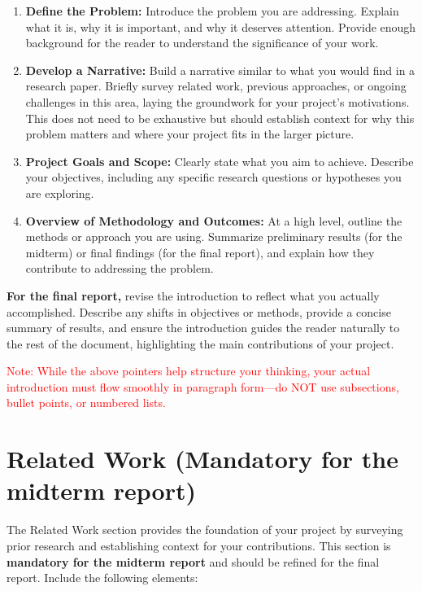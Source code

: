 \documentclass{article}
\begin{document}
\begin{enumerate}

\item\textbf{Define the Problem:} Introduce the problem you are addressing. Explain what it is, why it is important, and why it deserves attention. Provide enough background for the reader to understand the significance of your work.

\item\textbf{Develop a Narrative:} Build a narrative similar to what you would find in a research paper. Briefly survey related work, previous approaches, or ongoing challenges in this area, laying the groundwork for your project's motivations. This does not need to be exhaustive but should establish context for why this problem matters and where your project fits in the larger picture.

\item\textbf{Project Goals and Scope:} Clearly state what you aim to achieve. Describe your objectives, including any specific research questions or hypotheses you are exploring.

\item\textbf{Overview of Methodology and Outcomes:} At a high level, outline the methods or approach you are using. Summarize preliminary results (for the midterm) or final findings (for the final report), and explain how they contribute to addressing the problem.
\end{enumerate}

\textbf{For the final report,} revise the introduction to reflect what you actually accomplished. Describe any shifts in objectives or methods, provide a concise summary of results, and ensure the introduction guides the reader naturally to the rest of the document, highlighting the main contributions of your project.

\textcolor{red}{Note: While the above pointers help structure your thinking, your actual introduction must flow smoothly in paragraph form---do NOT use subsections, bullet points, or numbered lists.}

\section{Related Work (Mandatory for the midterm report)}

The Related Work section provides the foundation of your project by surveying prior research and establishing context for your contributions. This section is \textbf{mandatory for the midterm report} and should be refined for the final report. Include the following elements:
\end{document}
